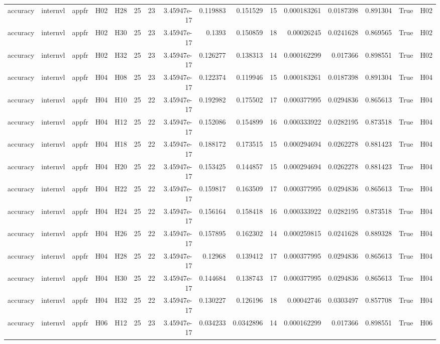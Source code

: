 \begin{longtable}{lllllrrrrrrrrrrl}
accuracy & internvl & appfr & H02 & H28 & 25 & 23 & 3.45947e-17 & 0.119883 & 0.151529 & 15 & 0.000183261 & 0.0187398 & 0.891304 & True & H02 \\
accuracy & internvl & appfr & H02 & H30 & 25 & 23 & 3.45947e-17 & 0.1393 & 0.150859 & 18 & 0.00026245 & 0.0241628 & 0.869565 & True & H02 \\
accuracy & internvl & appfr & H02 & H32 & 25 & 23 & 3.45947e-17 & 0.126277 & 0.138313 & 14 & 0.000162299 & 0.017366 & 0.898551 & True & H02 \\
accuracy & internvl & appfr & H04 & H08 & 25 & 23 & 3.45947e-17 & 0.122374 & 0.119946 & 15 & 0.000183261 & 0.0187398 & 0.891304 & True & H04 \\
accuracy & internvl & appfr & H04 & H10 & 25 & 22 & 3.45947e-17 & 0.192982 & 0.175502 & 17 & 0.000377995 & 0.0294836 & 0.865613 & True & H04 \\
accuracy & internvl & appfr & H04 & H12 & 25 & 22 & 3.45947e-17 & 0.152086 & 0.154899 & 16 & 0.000333922 & 0.0282195 & 0.873518 & True & H04 \\
accuracy & internvl & appfr & H04 & H18 & 25 & 22 & 3.45947e-17 & 0.188172 & 0.173515 & 15 & 0.000294694 & 0.0262278 & 0.881423 & True & H04 \\
accuracy & internvl & appfr & H04 & H20 & 25 & 22 & 3.45947e-17 & 0.153425 & 0.144857 & 15 & 0.000294694 & 0.0262278 & 0.881423 & True & H04 \\
accuracy & internvl & appfr & H04 & H22 & 25 & 22 & 3.45947e-17 & 0.159817 & 0.163509 & 17 & 0.000377995 & 0.0294836 & 0.865613 & True & H04 \\
accuracy & internvl & appfr & H04 & H24 & 25 & 22 & 3.45947e-17 & 0.156164 & 0.158418 & 16 & 0.000333922 & 0.0282195 & 0.873518 & True & H04 \\
accuracy & internvl & appfr & H04 & H26 & 25 & 22 & 3.45947e-17 & 0.157895 & 0.162302 & 14 & 0.000259815 & 0.0241628 & 0.889328 & True & H04 \\
accuracy & internvl & appfr & H04 & H28 & 25 & 22 & 3.45947e-17 & 0.12968 & 0.139412 & 17 & 0.000377995 & 0.0294836 & 0.865613 & True & H04 \\
accuracy & internvl & appfr & H04 & H30 & 25 & 22 & 3.45947e-17 & 0.144684 & 0.138743 & 17 & 0.000377995 & 0.0294836 & 0.865613 & True & H04 \\
accuracy & internvl & appfr & H04 & H32 & 25 & 22 & 3.45947e-17 & 0.130227 & 0.126196 & 18 & 0.00042746 & 0.0303497 & 0.857708 & True & H04 \\
accuracy & internvl & appfr & H06 & H12 & 25 & 23 & 3.45947e-17 & 0.034233 & 0.0342896 & 14 & 0.000162299 & 0.017366 & 0.898551 & True & H06 \\

\end{longtable}
